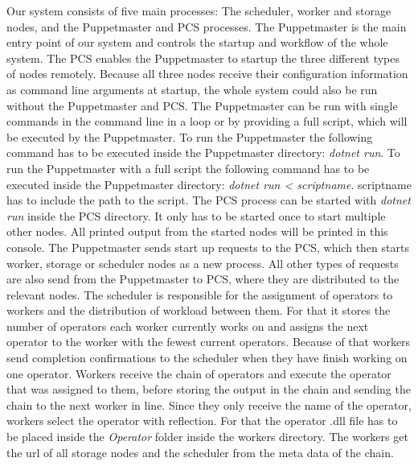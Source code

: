 \documentclass[times, 10pt,twocolumn]{article}
\begin{document}
Our system consists of five main processes: The scheduler, worker and storage nodes, and the Puppetmaster and PCS processes.
The Puppetmaster is the main entry point of our system and controls the startup and workflow of the whole system.
The PCS enables the Puppetmaster to startup the three different types of nodes remotely.
Because all three nodes receive their configuration information as command line arguments at startup, the whole system could also be run without the Puppetmaster and PCS.
The Puppetmaster can be run with single commands in the command line in a loop or by providing a full script, which will be executed by the Puppetmaster. \newline
To run the Puppetmaster the following command has to be executed inside the Puppetmaster directory:
\emph{dotnet run}. \newline
To run the Puppetmaster with a full script the following command has to be executed inside the Puppetmaster directory: 
\emph{dotnet run < scriptname}.
scriptname has to include the path to the script. \newline
The PCS process can be started with \emph{dotnet run} inside the PCS directory.
It only has to be started once to start multiple other nodes.
All printed output from the started nodes will be printed in this console.
The Puppetmaster sends start up requests to the PCS, which then starts worker, storage or scheduler nodes as a new process.
All other types of requests are also send from the Puppetmaster to PCS, where they are distributed to the relevant nodes. \newline
The scheduler is responsible for the assignment of operators to workers and the distribution of workload between them.
For that it stores the number of operators each worker currently works on and assigns the next operator to the worker with the fewest current operators.
Because of that workers send completion confirmations to the scheduler when they have finish working on one operator. \newline
Workers receive the chain of operators and execute the operator that was assigned to them, before storing the output in the chain and sending the chain to the next worker in line.
Since they only receive the name of the operator, workers select the operator with reflection.
For that the operator .dll file has to be placed inside the \emph{Operator} folder inside the workers directory.
The workers get the url of all storage nodes and the scheduler from the meta data of the chain.
\newline
\end{document}
